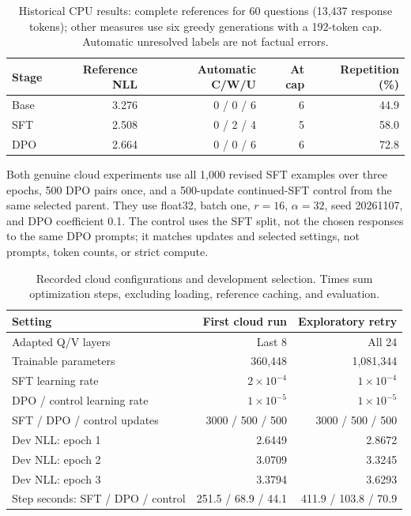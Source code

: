 \begin{table}[H]\centering\small
\caption{Historical CPU results: complete references for 60 questions (13,437 response tokens); other measures use six greedy generations with a 192-token cap. Automatic unresolved labels are not factual errors.}\label{tab:training-cpu}
\begin{tabularx}{\linewidth}{@{}Yrrrr@{}}\toprule
Stage & Reference NLL & Automatic C/W/U & At cap & Repetition (\%)\\\midrule
Base & 3.276 & 0 / 0 / 6 & 6 & 44.9\\
SFT & 2.508 & 0 / 2 / 4 & 5 & 58.0\\
DPO & 2.664 & 0 / 0 / 6 & 6 & 72.8\\\bottomrule
\end{tabularx}
\end{table}\FloatBarrier

Both genuine cloud experiments use all 1,000 revised SFT examples over three epochs, 500 DPO pairs once, and a 500-update continued-SFT control from the same selected parent. They use float32, batch one, $r=16$, $\alpha=32$, seed 20261107, and DPO coefficient 0.1. The control uses the SFT split, not the chosen responses to the same DPO prompts; it matches updates and selected settings, not prompts, token counts, or strict compute.

\begin{table}[H]\centering\small
\caption{Recorded cloud configurations and development selection. Times sum optimization steps, excluding loading, reference caching, and evaluation.}\label{tab:training-protocol}
\begin{tabularx}{\linewidth}{@{}Yrr@{}}\toprule
Setting & First cloud run & Exploratory retry\\\midrule
Adapted Q/V layers & Last 8 & All 24\\
Trainable parameters & 360,448 & 1,081,344\\
SFT learning rate & $2\times10^{-4}$ & $1\times10^{-4}$\\
DPO / control learning rate & $1\times10^{-5}$ & $1\times10^{-5}$\\
SFT / DPO / control updates & 3000 / 500 / 500 & 3000 / 500 / 500\\
Dev NLL: epoch 1 & 2.6449 & 2.8672\\
Dev NLL: epoch 2 & 3.0709 & 3.3245\\
Dev NLL: epoch 3 & 3.3794 & 3.6293\\
Step seconds: SFT / DPO / control & 251.5 / 68.9 / 44.1 & 411.9 / 103.8 / 70.9\\\bottomrule
\end{tabularx}
\end{table}\FloatBarrier

